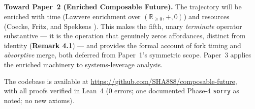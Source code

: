 \documentclass[11pt,a4paper]{article}
\begin{document}
\textbf{Toward Paper~2 (Enriched Composable Future).} The trajectory will be
enriched with time (Lawvere enrichment over $(\mathbb{R}_{\geq 0}, +, 0)$) and
resources (Coecke, Fritz, and Spekkens \cite{coecke2016}). This makes the
fifth, unary \emph{terminate} operator substantive --- it is the operation
that genuinely zeros affordances, distinct from identity (\textbf{Remark 4.1})
--- and provides the formal account of fork timing and \emph{absorptive}
merge, both deferred from Paper~1's symmetric scope. Paper~3 applies the
enriched machinery to systems-leverage analysis.

The codebase is available at
\url{https://github.com/SHA888/composable-future}, with all proofs verified in
Lean~4 (0 errors; one documented Phase-4 \texttt{sorry} as noted; no new
axioms).



\end{document}
